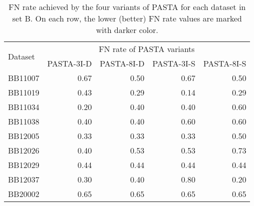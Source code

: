 \begin{table}[htbp]
	\centering
	\small
	\caption{FN rate achieved by the four variants of PASTA for each dataset in set B. On each row, the lower (better) FN rate values are marked with darker color.}
	\begin{tabular}{|l|r|r|r|r|}
		\hline
		\multirow{2}{*}{Dataset} & \multicolumn{4}{c|}{FN rate of PASTA variants} \\
		\cline{2-5}          & \multicolumn{1}{l|}{PASTA-3I-D} & \multicolumn{1}{l|}{PASTA-8I-D} & \multicolumn{1}{l|}{PASTA-3I-S} & \multicolumn{1}{l|}{PASTA-8I-S} \\
		\hline
		BB11007 & \cellcolor[rgb]{ .988,  1,  .992}0.67 & \cellcolor[rgb]{ .384,  .745,  .478}0.50 & \cellcolor[rgb]{ .988,  1,  .992}0.67 & \cellcolor[rgb]{ .384,  .745,  .478}0.50 \\
		\hline
		BB11019 & \cellcolor[rgb]{ .988,  1,  .992}0.43 & \cellcolor[rgb]{ .682,  .871,  .733}0.29 & \cellcolor[rgb]{ .384,  .745,  .478}0.14 & \cellcolor[rgb]{ .682,  .871,  .733}0.29 \\
		\hline
		BB11034 & \cellcolor[rgb]{ .384,  .745,  .478}0.20 & \cellcolor[rgb]{ .686,  .871,  .733}0.40 & \cellcolor[rgb]{ .686,  .871,  .733}0.40 & \cellcolor[rgb]{ .988,  1,  .992}0.60 \\
		\hline
		BB11038 & \cellcolor[rgb]{ .384,  .745,  .478}0.40 & \cellcolor[rgb]{ .384,  .745,  .478}0.40 & \cellcolor[rgb]{ .988,  1,  .992}0.60 & \cellcolor[rgb]{ .988,  1,  .992}0.60 \\
		\hline
		BB12005 & \cellcolor[rgb]{ .384,  .745,  .478}0.33 & \cellcolor[rgb]{ .384,  .745,  .478}0.33 & \cellcolor[rgb]{ .384,  .745,  .478}0.33 & \cellcolor[rgb]{ .988,  1,  .992}0.50 \\
		\hline
		BB12026 & \cellcolor[rgb]{ .384,  .745,  .478}0.40 & \cellcolor[rgb]{ .624,  .843,  .682}0.53 & \cellcolor[rgb]{ .624,  .843,  .682}0.53 & \cellcolor[rgb]{ .988,  1,  .992}0.73 \\
		\hline
		BB12029 & \cellcolor[rgb]{ .988,  1,  .992}0.44 & \cellcolor[rgb]{ .988,  1,  .992}0.44 & \cellcolor[rgb]{ .988,  1,  .992}0.44 & \cellcolor[rgb]{ .988,  1,  .992}0.44 \\
		\hline
		BB12037 & \cellcolor[rgb]{ .482,  .784,  .561}0.30 & \cellcolor[rgb]{ .584,  .827,  .647}0.40 & \cellcolor[rgb]{ .988,  1,  .992}0.80 & \cellcolor[rgb]{ .384,  .745,  .478}0.20 \\
		\hline
		BB20002 & \cellcolor[rgb]{ .988,  1,  .992}0.65 & \cellcolor[rgb]{ .988,  1,  .992}0.65 & \cellcolor[rgb]{ .988,  1,  .992}0.65 & \cellcolor[rgb]{ .988,  1,  .992}0.65 \\

\end{tabular}
\end{table}
